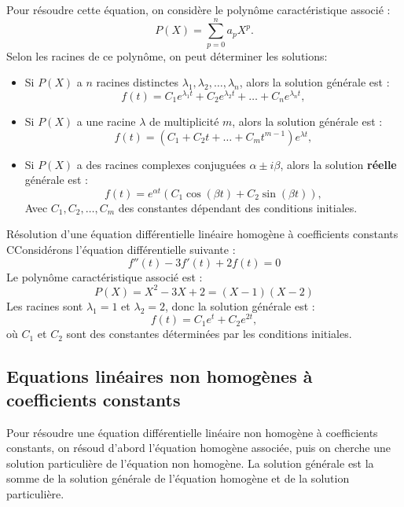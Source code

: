 \documentclass[a4paper,11pt]{article}
\begin{document}
            Pour résoudre cette équation, on considère le polynôme caractéristique associé :
            \begin{equation}
                P(X) = \sum_{p=0}^{n} a_p X^p.
            \end{equation}
            Selon les racines de ce polynôme, on peut déterminer les solutions:
            \begin{itemize}
                \item Si $P(X)$ a $n$ racines distinctes $\lambda_1, \lambda_2, \ldots, \lambda_n$, alors la solution générale est :
                \begin{equation}
                    f(t) = C_1 e^{\lambda_1 t} + C_2 e^{\lambda_2 t} + \ldots + C_n e^{\lambda_n t},
                \end{equation}

                \item Si $P(X)$ a une racine $\lambda$ de multiplicité $m$, alors la solution générale est :
                \begin{equation}
                    f(t) = (C_1 + C_2 t + \ldots + C_m t^{m-1}) e^{\lambda t},
                \end{equation}

                \item Si $P(X)$ a des racines complexes conjuguées $\alpha \pm i\beta$, alors la solution \textbf{réelle} générale est :
                    $$ f(t) = e^{\alpha t} (C_1 \cos(\beta t) + C_2 \sin(\beta t)), $$
                Avec $C_1, C_2, \ldots, C_m$ des constantes dépendant des conditions initiales.
            \end{itemize}

            \begin{exemple}{Résolution d'une équation différentielle linéaire homogène à coefficients constants}
                CConsidérons l'équation différentielle suivante :
                    $$ f''(t) - 3f'(t) + 2f(t) = 0 $$
                Le polynôme caractéristique associé est :
                    $$ P(X) = X^2 - 3X + 2 = (X-1)(X-2) $$
                Les racines sont $\lambda_1 = 1$ et $\lambda_2 = 2$, donc la solution générale est :
                    $$ f(t) = C_1 e^{t} + C_2 e^{2t}, $$
                où $C_1$ et $C_2$ sont des constantes déterminées par les conditions initiales.
            \end{exemple}

            \subsection*{Equations linéaires non homogènes à coefficients constants}
            Pour résoudre une équation différentielle linéaire non homogène à coefficients constants, on résoud d'abord l'équation homogène associée, puis on cherche une solution particulière de l'équation non homogène. La solution générale est la somme de la solution générale de l'équation homogène et de la solution particulière.
\end{document}
